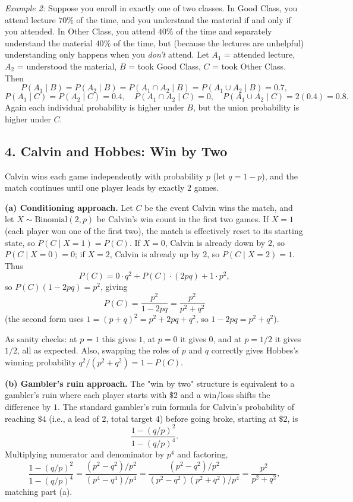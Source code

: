 \documentclass{article}
\begin{document}
\medskip
\emph{Example 2:} Suppose you enroll in exactly one of two classes. In Good Class, you attend lecture $70\%$ of the time, and you understand the material if and only if you attended. In Other Class, you attend $40\%$ of the time and separately understand the material $40\%$ of the time, but (because the lectures are unhelpful) understanding only happens when you \emph{don't} attend. Let $A_1$ = attended lecture, $A_2$ = understood the material, $B$ = took Good Class, $C$ = took Other Class. Then
$$
P(A_1\mid B)=P(A_2\mid B)=P(A_1\cap A_2\mid B)=P(A_1\cup A_2\mid B)=0.7,
$$
$$
P(A_1\mid C)=P(A_2\mid C)=0.4,\quad P(A_1\cap A_2\mid C)=0,\quad P(A_1\cup A_2\mid C)=2(0.4)=0.8.
$$
Again each individual probability is higher under $B$, but the union probability is higher under $C$.

\subsection*{4. Calvin and Hobbes: Win by Two}

Calvin wins each game independently with probability $p$ (let $q=1-p$), and the match continues until one player leads by exactly $2$ games.

\medskip
\textbf{(a) Conditioning approach.} Let $C$ be the event Calvin wins the match, and let $X\sim\text{Binomial}(2,p)$ be Calvin's win count in the first two games. If $X=1$ (each player won one of the first two), the match is effectively reset to its starting state, so $P(C\mid X=1)=P(C)$. If $X=0$, Calvin is already down by $2$, so $P(C\mid X=0)=0$; if $X=2$, Calvin is already up by $2$, so $P(C\mid X=2)=1$. Thus
$$
P(C) = 0\cdot q^2 + P(C)\cdot(2pq) + 1\cdot p^2,
$$
so $P(C)(1-2pq)=p^2$, giving
$$
P(C) = \frac{p^2}{1-2pq} = \frac{p^2}{p^2+q^2}
$$
(the second form uses $1=(p+q)^2=p^2+2pq+q^2$, so $1-2pq=p^2+q^2$).

As sanity checks: at $p=1$ this gives $1$, at $p=0$ it gives $0$, and at $p=1/2$ it gives $1/2$, all as expected. Also, swapping the roles of $p$ and $q$ correctly gives Hobbes's winning probability $q^2/(p^2+q^2) = 1-P(C)$.

\medskip
\textbf{(b) Gambler's ruin approach.} The "win by two" structure is equivalent to a gambler's ruin where each player starts with $\$2$ and a win/loss shifts the difference by $1$. The standard gambler's ruin formula for Calvin's probability of reaching $\$4$ (i.e., a lead of $2$, total target $4$) before going broke, starting at $\$2$, is
$$
\frac{1-(q/p)^2}{1-(q/p)^4}.
$$
Multiplying numerator and denominator by $p^4$ and factoring,
$$
\frac{1-(q/p)^2}{1-(q/p)^4} = \frac{(p^2-q^2)/p^2}{(p^4-q^4)/p^4} = \frac{(p^2-q^2)/p^2}{(p^2-q^2)(p^2+q^2)/p^4} = \frac{p^2}{p^2+q^2},
$$
matching part (a).
\end{document}
